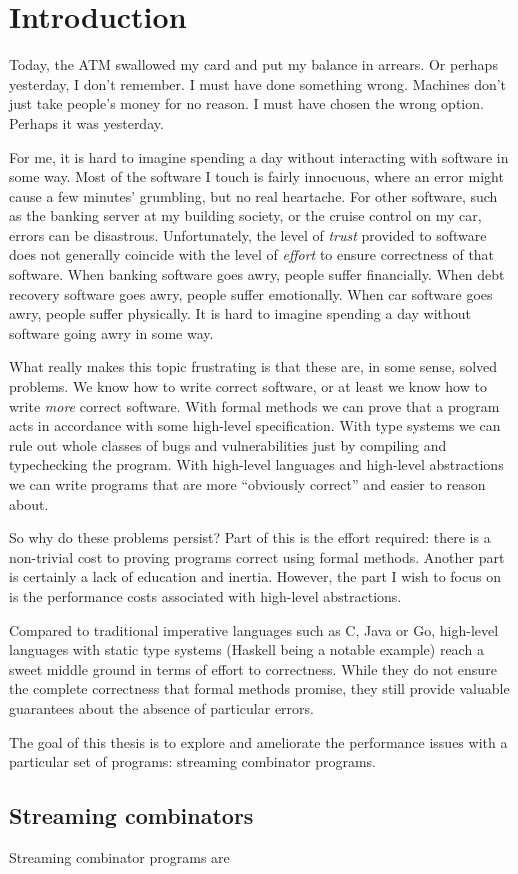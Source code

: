 \chapter{Introduction}

Today, the ATM swallowed my card and put my balance in arrears.
Or perhaps yesterday, I don't remember.
I must have done something wrong.
Machines don't just take people's money for no reason. 
I must have chosen the wrong option.
Perhaps it was yesterday.

For me, it is hard to imagine spending a day without interacting with software in some way.
Most of the software I touch is fairly innocuous, where an error might cause a few minutes' grumbling, but no real heartache.
For other software, such as the banking server at my building society, or the cruise control on my car, errors can be disastrous.
Unfortunately, the level of \emph{trust} provided to software does not generally coincide with the level of \emph{effort} to ensure correctness of that software.
When banking software goes awry, people suffer financially.
When debt recovery software goes awry, people suffer emotionally.
When car software goes awry, people suffer physically.
It is hard to imagine spending a day without software going awry in some way.

What really makes this topic frustrating is that these are, in some sense, solved problems.
We know how to write correct software, or at least we know how to write \emph{more} correct software.
With formal methods we can prove that a program acts in accordance with some high-level specification.
With type systems we can rule out whole classes of bugs and vulnerabilities just by compiling and typechecking the program.
With high-level languages and high-level abstractions we can write programs that are more ``obviously correct'' and easier to reason about.

So why do these problems persist?
Part of this is the effort required: there is a non-trivial cost to proving programs correct using formal methods.
Another part is certainly a lack of education and inertia.
However, the part I wish to focus on is the performance costs associated with high-level abstractions.

Compared to traditional imperative languages such as C, Java or Go, high-level languages with static type systems (Haskell being a notable example) reach a sweet middle ground in terms of effort to correctness.
While they do not ensure the complete correctness that formal methods promise, they still provide valuable guarantees about the absence of particular errors.

The goal of this thesis is to explore and ameliorate the performance issues with a particular set of programs: streaming combinator programs.

\section{Streaming combinators}

Streaming combinator programs are 

